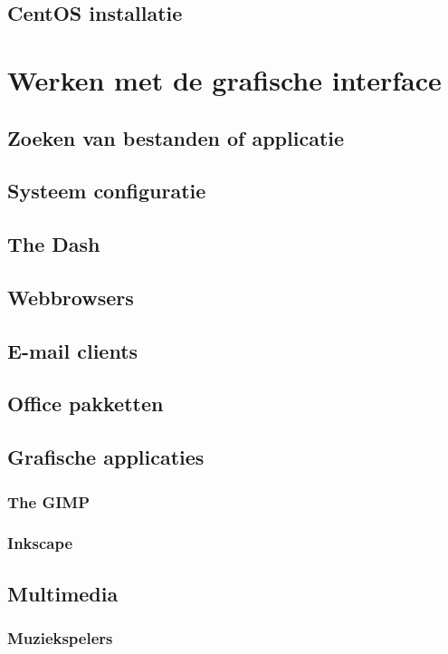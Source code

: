 \documentclass[a4paper,12pt,twoside,openright,titlepage]{book}
\begin{document}
\section{CentOS installatie}


\chapter{Werken met de grafische interface}

\section{Zoeken van bestanden of applicatie}

\section{Systeem configuratie}

\section{The Dash}

\section{Webbrowsers}

\section{E-mail clients}

\section{Office pakketten}

\section{Grafische applicaties}

\subsection{The GIMP}

\subsection{Inkscape}

\section{Multimedia}

\subsection{Muziekspelers}
\end{document}
